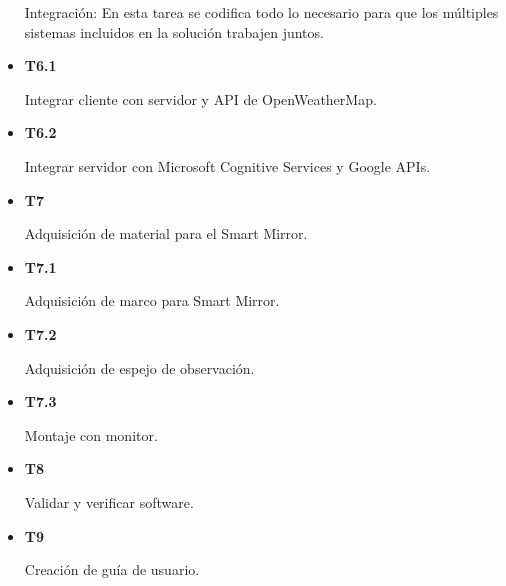 \begin{itemize}
	Integración: En esta tarea se codifica todo lo necesario para que los múltiples sistemas incluidos en la solución trabajen juntos.
	
	\item \textbf{T6.1}
	
	Integrar cliente con servidor y API de OpenWeatherMap.
	
	\item \textbf{T6.2}	
	
	Integrar servidor con Microsoft Cognitive Services y Google APIs.
	
	\item \textbf{T7}	
	
	Adquisición de material para el Smart Mirror.
	
	\item \textbf{T7.1}	
	
	Adquisición de marco para Smart Mirror.
	
	\item \textbf{T7.2}
	
	Adquisición de espejo de observación.
	
	\item \textbf{T7.3}	
	
	Montaje con monitor.
	
	\item \textbf{T8}	
	
	Validar y verificar software.
	
	\item \textbf{T9}	
	
	Creación de guía de usuario.

\end{itemize}